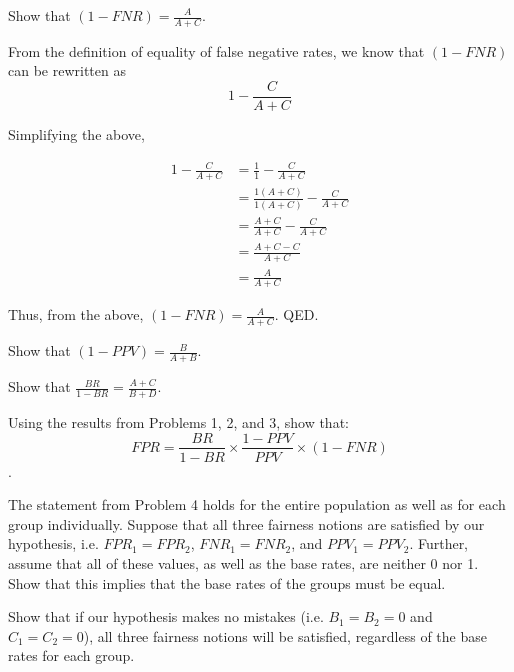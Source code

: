 \documentclass{cisXXX} %
\begin{document}
\maketitle
\HWproblem
Show that $(1-FNR) = \frac{A}{A+C}$.

From the definition of equality of false negative rates, we know that $(1-FNR)$ can be rewritten as 
$$1-\frac{C}{A+C}$$

Simplifying the above,


\begin{align*}
1-\frac{C}{A+C} &= \frac{1}{1} - \frac{C}{A+C}\\
&=\frac{1(A+C)}{1(A+C)} - \frac{C}{A+C}\\
&=\frac{A+C}{A+C} - \frac{C}{A+C}\\
&=\frac{A+C-C}{A+C}\\
&=\frac{A}{A+C}
\end{align*}


Thus, from the above, $(1-FNR) = \frac{A}{A+C}$. QED.

\HWproblem
Show that $(1-PPV) = \frac{B}{A+B}$.

\HWproblem
Show that $\frac{BR}{1-BR} = \frac{A+C}{B+D}$.

\HWproblem
Using the results from Problems 1, 2, and 3, show that:
$$FPR = \frac{BR}{1-BR}\times\frac{1-PPV}{PPV}\times(1 -FNR)$$
.

\HWproblem
The statement from Problem 4 holds for the entire population as well as for each group individually. Suppose that all three fairness notions are satisfied by our hypothesis, i.e. $FPR_1 = FPR_2$, $FNR_1 = FNR_2$, and $PPV_1 = PPV_2$. Further, assume that all of these values, as well as the base rates, are neither 0 nor 1. Show that this implies that the base rates of the groups must be equal.

\HWproblem
Show that if our hypothesis makes no mistakes (i.e. $B_1 = B_2 = 0$ and $C_1 = C_2 = 0$), all three fairness notions will be satisfied, regardless of the base rates for each group.
\end{document}
